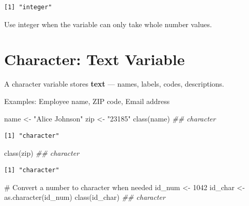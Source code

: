 \documentclass[
  letterpaper,
  DIV=11,
  numbers=noendperiod]{scrreprt}
\newenvironment{Shaded}{\begin{snugshade}}{\end{snugshade}}
\newcommand{\CommentTok}[1]{\textcolor[rgb]{0.37,0.37,0.37}{#1}}
\newcommand{\DecValTok}[1]{\textcolor[rgb]{0.68,0.00,0.00}{#1}}
\newcommand{\DocumentationTok}[1]{\textcolor[rgb]{0.37,0.37,0.37}{\textit{#1}}}
\newcommand{\FunctionTok}[1]{\textcolor[rgb]{0.28,0.35,0.67}{#1}}
\newcommand{\NormalTok}[1]{\textcolor[rgb]{0.00,0.23,0.31}{#1}}
\newcommand{\OtherTok}[1]{\textcolor[rgb]{0.00,0.23,0.31}{#1}}
\newcommand{\SpecialCharTok}[1]{\textcolor[rgb]{0.37,0.37,0.37}{#1}}
\newcommand{\StringTok}[1]{\textcolor[rgb]{0.13,0.47,0.30}{#1}}
\begin{document}
\begin{Shaded}
\end{Shaded}

\begin{verbatim}
[1] "integer"
\end{verbatim}

Use integer when the variable can only take whole number values.

\section{Character: Text Variable}\label{character-text-variable}

A character variable stores \textbf{text} --- names, labels, codes,
descriptions.

Examples: Employee name, ZIP code, Email address

\begin{Shaded}
\begin{Highlighting}[]
\NormalTok{name }\OtherTok{\textless{}{-}} \StringTok{"Alice Johnson"}
\NormalTok{zip }\OtherTok{\textless{}{-}} \StringTok{"23185"}
\FunctionTok{class}\NormalTok{(name)  }\DocumentationTok{\#\# \textquotesingle{}character\textquotesingle{}}
\end{Highlighting}
\end{Shaded}

\begin{verbatim}
[1] "character"
\end{verbatim}

\begin{Shaded}
\begin{Highlighting}[]
\FunctionTok{class}\NormalTok{(zip)  }\DocumentationTok{\#\# \textquotesingle{}character\textquotesingle{}}
\end{Highlighting}
\end{Shaded}

\begin{verbatim}
[1] "character"
\end{verbatim}

\begin{Shaded}
\begin{Highlighting}[]
\CommentTok{\# Convert a number to character when needed}
\NormalTok{id\_num }\OtherTok{\textless{}{-}} \DecValTok{1042}
\NormalTok{id\_char }\OtherTok{\textless{}{-}} \FunctionTok{as.character}\NormalTok{(id\_num)}
\FunctionTok{class}\NormalTok{(id\_char)  }\DocumentationTok{\#\# \textquotesingle{}character\textquotesingle{}}
\end{Highlighting}
\end{Shaded}
\end{document}
